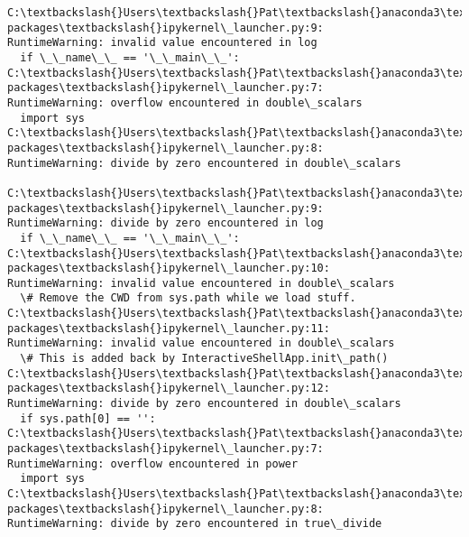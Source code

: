 \documentclass[11pt]{article}
\begin{document}
    \begin{Verbatim}[commandchars=\\\{\}]
C:\textbackslash{}Users\textbackslash{}Pat\textbackslash{}anaconda3\textbackslash{}lib\textbackslash{}site-packages\textbackslash{}ipykernel\_launcher.py:9:
RuntimeWarning: invalid value encountered in log
  if \_\_name\_\_ == '\_\_main\_\_':
C:\textbackslash{}Users\textbackslash{}Pat\textbackslash{}anaconda3\textbackslash{}lib\textbackslash{}site-packages\textbackslash{}ipykernel\_launcher.py:7:
RuntimeWarning: overflow encountered in double\_scalars
  import sys
C:\textbackslash{}Users\textbackslash{}Pat\textbackslash{}anaconda3\textbackslash{}lib\textbackslash{}site-packages\textbackslash{}ipykernel\_launcher.py:8:
RuntimeWarning: divide by zero encountered in double\_scalars

C:\textbackslash{}Users\textbackslash{}Pat\textbackslash{}anaconda3\textbackslash{}lib\textbackslash{}site-packages\textbackslash{}ipykernel\_launcher.py:9:
RuntimeWarning: divide by zero encountered in log
  if \_\_name\_\_ == '\_\_main\_\_':
C:\textbackslash{}Users\textbackslash{}Pat\textbackslash{}anaconda3\textbackslash{}lib\textbackslash{}site-packages\textbackslash{}ipykernel\_launcher.py:10:
RuntimeWarning: invalid value encountered in double\_scalars
  \# Remove the CWD from sys.path while we load stuff.
C:\textbackslash{}Users\textbackslash{}Pat\textbackslash{}anaconda3\textbackslash{}lib\textbackslash{}site-packages\textbackslash{}ipykernel\_launcher.py:11:
RuntimeWarning: invalid value encountered in double\_scalars
  \# This is added back by InteractiveShellApp.init\_path()
C:\textbackslash{}Users\textbackslash{}Pat\textbackslash{}anaconda3\textbackslash{}lib\textbackslash{}site-packages\textbackslash{}ipykernel\_launcher.py:12:
RuntimeWarning: divide by zero encountered in double\_scalars
  if sys.path[0] == '':
C:\textbackslash{}Users\textbackslash{}Pat\textbackslash{}anaconda3\textbackslash{}lib\textbackslash{}site-packages\textbackslash{}ipykernel\_launcher.py:7:
RuntimeWarning: overflow encountered in power
  import sys
C:\textbackslash{}Users\textbackslash{}Pat\textbackslash{}anaconda3\textbackslash{}lib\textbackslash{}site-packages\textbackslash{}ipykernel\_launcher.py:8:
RuntimeWarning: divide by zero encountered in true\_divide


\end{Verbatim}
\end{document}
